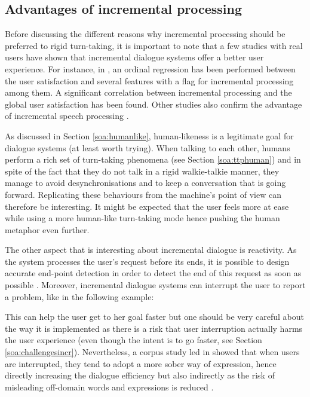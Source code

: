       \subsection{Advantages of incremental processing}

                Before discussing the different reasons why incremental processing should be preferred to rigid turn-taking, it is important to note that a few studies with real users have shown that incremental dialogue systems offer a better user experience. For instance, in \cite{Aist2007}, an ordinal regression has been performed between the user satisfaction and several features with a flag for incremental processing among them. A significant correlation between incremental processing and the global user satisfaction has been found. Other studies also confirm the advantage of incremental speech processing \cite{Skantze2009,El-Asri2014a,Zhao2015}.

                As discussed in Section \ref{soa:humanlike}, human-likeness is a legitimate goal for dialogue systems (at least worth trying). When talking to each other, humans perform a rich set of turn-taking phenomena (see Section \ref{soa:ttphuman}) and in spite of the fact that they do not talk in a rigid walkie-talkie manner, they manage to avoid desynchronisations and to keep a conversation that is going forward. Replicating these behaviours from the machine's point of view can therefore be interesting. It might be expected that the user feels more at ease while using a more human-like turn-taking mode hence pushing the human metaphor even further.

                The other aspect that is interesting about incremental dialogue is reactivity. As the system processes the user's request before its ends, it is possible to design accurate end-point detection in order to detect the end of this request as soon as possible \cite{Raux2008}. Moreover, incremental dialogue systems can interrupt the user to report a problem, like in the following example:
                
                \begin{dialogue}
                  \end{dialogue}
                  
                  This can help the user get to her goal faster but one should be very careful about the way it is implemented as there is a risk that user interruption actually harms the user experience (even though the intent is to go faster, see Section \ref{soa:challengesincr}). Nevertheless, a corpus study led in \cite{Ghigi2014} showed that when users are interrupted, they tend to adopt a more sober way of expression, hence directly increasing the dialogue efficiency but also indirectly as the risk of misleading off-domain words and expressions is reduced \cite{Zhao2015}.
                  
